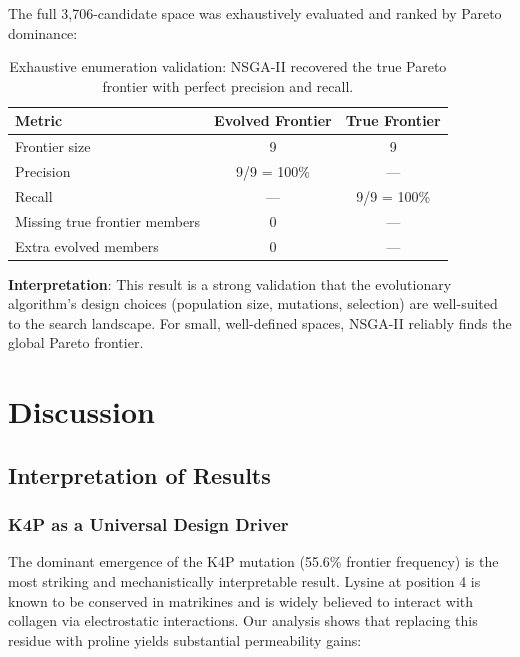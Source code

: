 \documentclass[11pt,a4paper]{article}
\begin{document}
The full 3,706-candidate space was exhaustively evaluated and ranked by Pareto dominance:

\begin{table}[H]
\centering
\small
\begin{tabular}{lcc}
\toprule
\textbf{Metric} & \textbf{Evolved Frontier} & \textbf{True Frontier} \\
\midrule
Frontier size & 9 & 9 \\
Precision & 9/9 = 100\% & — \\
Recall & — & 9/9 = 100\% \\
Missing true frontier members & 0 & — \\
Extra evolved members & 0 & — \\
\bottomrule
\end{tabular}
\caption{Exhaustive enumeration validation: NSGA-II recovered the true Pareto frontier with perfect precision and recall.}
\label{tab:validation}
\end{table}

\textbf{Interpretation}: This result is a strong validation that the evolutionary algorithm's design choices (population size, mutations, selection) are well-suited to the search landscape. For small, well-defined spaces, NSGA-II reliably finds the global Pareto frontier.

\section{Discussion}

\subsection{Interpretation of Results}

\subsubsection{K4P as a Universal Design Driver}

The dominant emergence of the K4P mutation (55.6\% frontier frequency) is the most striking and mechanistically interpretable result. Lysine at position 4 is known to be conserved in matrikines and is widely believed to interact with collagen via electrostatic interactions\cite{matrikine2010}. Our analysis shows that replacing this residue with proline yields substantial permeability gains:
\end{document}
